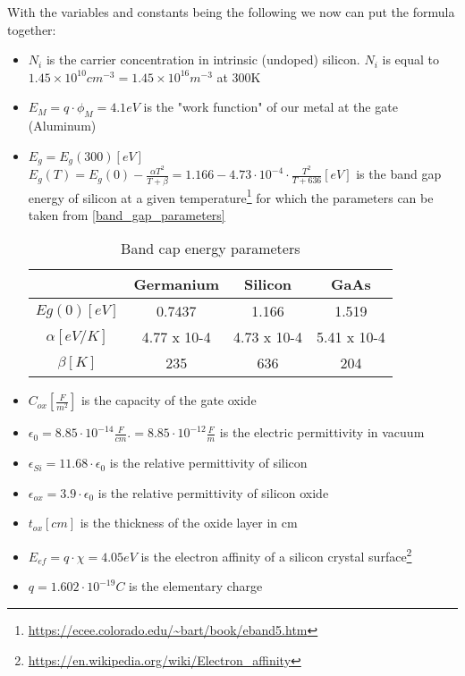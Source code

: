 With the variables and constants being the following we now can put the formula together:
\begin{itemize}
\item $N_i$ is the carrier concentration in intrinsic (undoped) silicon. $N_i$ is equal to $1.45 \times 10^{10} cm^{-3} = 1.45 \times 10^{16} m^{-3}$ at 300\degree K
\item $E_M = q\cdot\phi_M = 4.1 eV$ is the "work function" of our metal at the gate (Aluminum)
\item $E_g=E_g(300) [eV]$ \\
$E_g(T) = E_g(0) - \frac{\alpha T^2}{T+\beta} = 1.166 - 4.73 \cdot 10^{-4} \cdot \frac{T^2}{T+636} [eV]$ is the band gap energy of silicon at a given temperature\footnote{\url{https://ecee.colorado.edu/~bart/book/eband5.htm}} for which the parameters can be taken from \autoref{band_gap_parameters}
\begin{table}[H]
\centering
\begin{tabular}{|c|c|c|c|}
\hline
{} &
\textbf{Germanium} &
\textbf{Silicon} &
\textbf{GaAs} \\
\hline
$Eg(0) [eV]$ &
0.7437 &
1.166 &
1.519 \\
\hline
$\alpha [eV/K]$ &
4.77 x 10-4 &
4.73 x 10-4 &
5.41 x 10-4 \\
\hline
$\beta [K]$ &
235 &
636 &
204 \\
\hline
\end{tabular}
\caption{Band cap energy parameters}
\label{band_gap_parameters}
\end{table}
\item $C_{ox} \left[\frac{F}{m^2}\right]$ is the capacity of the gate oxide
\item $\epsilon_0 = 8.85 \cdot 10^{-14} \frac{F}{cm}.= 8.85 \cdot 10^{-12} \frac{F}{m} $ is the electric permittivity in vacuum
\item $\epsilon_{Si} =11.68 \cdot \epsilon_0$ is the relative permittivity of silicon
\item $\epsilon_{ox} = 3.9 \cdot \epsilon_0$ is the relative permittivity of silicon oxide
\item $t_{ox} [cm]$ is the thickness of the oxide layer in cm
\item $E_{ef} = q \cdot \chi = 4.05 eV$ is the electron affinity of a silicon crystal surface\footnote{\url{https://en.wikipedia.org/wiki/Electron_affinity}}
\item $q=1.602 \cdot 10^{-19} C$ is the elementary charge
\end{itemize} 

